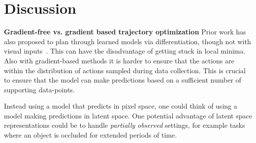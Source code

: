\section{Discussion}


\textbf{Gradient-free vs. gradient based trajectory optimization} Prior work has also proposed to plan through learned models via differentiation, though not with visual inputs~\cite{deep_mpc}. This can have the disadvantage of getting stuck in local minima. Also with gradient-based methods it is harder to ensure that the actions are within the distribution of actions sampled during data collection. This is crucial to ensure that the model can make predictions based on a sufficient number of supporting data-points.


Instead using a model that predicts in pixel space, one could think of using a model making predictions in latent space. One potential advantage of latent space representations could be to handle \emph{partially observed} settings, for example tasks where an object is occluded for extended periods of time.


